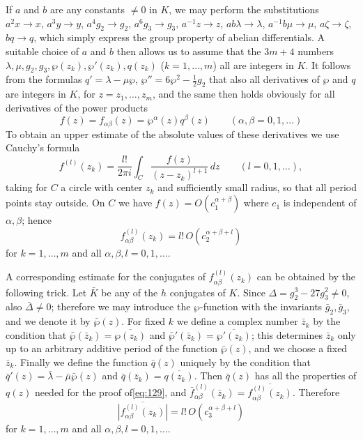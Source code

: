 If $a$ and $b$ are any constants $\neq 0$ in $K$, we may perform the substitutions $a^2 x \to x$, $a^3 y \to y$, $a^4 g_2 \to g_2$, $a^6 g_3 \to g_3$, $a^{-1} z \to z$, $ab \lambda \to \lambda$, $a^{-1} b \mu \to \mu$, $a \zeta \to \zeta$, $b q \to q$, which simply express the group property of abelian differentials. A suitable choice of $a$ and $b$ then allows us to assume that the $3m+4$ numbers $\lambda, \mu, g_2, g_3, \wp(z_k), \wp'(z_k), q(z_k)$ ($k=1, \dots, m$) all are integers in $K$. It follows from the formulas $q' = \lambda - \mu \wp$, $\wp'' = 6 \wp^2 - \frac{1}{2} g_2$ that also all derivatives of $\wp$ and $q$ are integers in $K$, for $z = z_1, \dots, z_m$, and the same then holds obviously for all derivatives of the power products
\[
f(z) = f_{\alpha\beta}(z) = \wp^{\alpha}(z)q^{\beta}(z) \qquad (\alpha, \beta=0,1,\dots)
\]
To obtain an upper estimate of the absolute values of these derivatives we use Cauchy's formula
\[
f^{(l)}(z_k) = \frac{l!}{2\pi i} \int_C \frac{f(z)}{(z-z_k)^{l+1}} \, dz \qquad (l=0,1,\dots),
\]
taking for $C$ a circle with center $z_k$ and sufficiently small radius, so that all period points stay outside. On $C$ we have $f(z) = O(c_1^{\alpha+\beta})$ where $c_1$ is independent of $\alpha, \beta$; hence
\begin{equation}
f_{\alpha\beta}^{(l)}(z_k) = l! \, O(c_2^{\alpha+\beta+l}) \tag{129}\label{eq:129}
\end{equation}
for $k=1, \dots, m$ and all $\alpha, \beta, l = 0, 1, \dots$.

A corresponding estimate for the conjugates of $f_{\alpha\beta}^{(l)}(z_k)$ can be obtained by the following trick. Let $\bar{K}$ be any of the $h$ conjugates of $K$. Since $\Delta = g_2^3 - 27g_3^2 \neq 0$, also $\bar{\Delta} \neq 0$; therefore we may introduce the $\wp$-function with the invariants $\bar{g}_2, \bar{g}_3$, and we denote it by $\bar{\wp}(z)$. For fixed $k$ we define a complex number $\bar{z}_k$ by the condition that $\bar{\wp}(\bar{z}_k) = \overline{\wp(z_k)}$ and $\bar{\wp}'(\bar{z}_k) = \overline{\wp'(z_k)}$; this determines $\bar{z}_k$ only up to an arbitrary additive period of the function $\bar{\wp}(z)$, and we choose a fixed $\bar{z}_k$. Finally we define the function $\bar{q}(z)$ uniquely by the condition that $\bar{q}'(z) = \bar{\lambda} - \bar{\mu} \bar{\wp}(z)$ and $\bar{q}(\bar{z}_k) = \overline{q(z_k)}$. Then $\bar{q}(z)$ has all the properties of $q(z)$ needed for the proof of\eqref{eq:129}, and $\bar{f}_{\alpha\beta}^{(l)}(\bar{z}_k) = \overline{f_{\alpha\beta}^{(l)}(z_k)}$. Therefore
\begin{equation}
\overline{|f_{\alpha\beta}^{(l)}(z_k)|} = l! \, O(c_3^{\alpha+\beta+l}) \tag{130}\label{eq:130}
\end{equation}
for $k=1, \dots, m$ and all $\alpha, \beta, l = 0, 1, \dots$.

